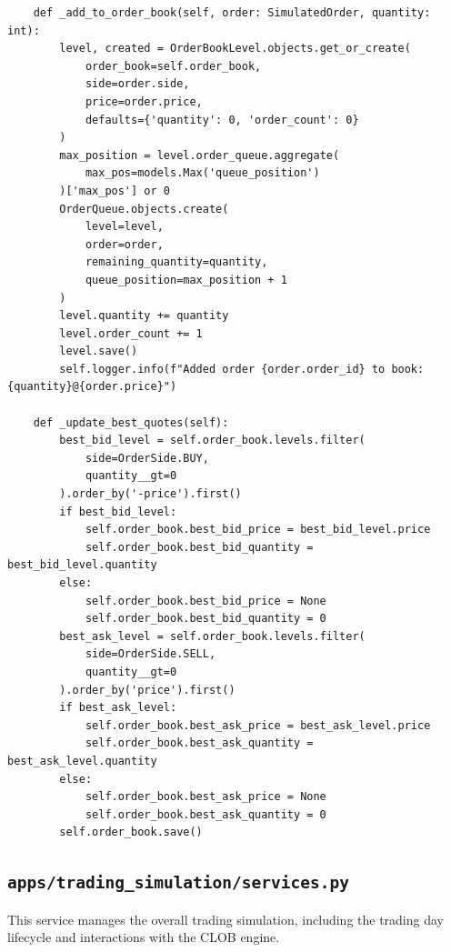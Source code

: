\documentclass[12pt]{article}
\begin{document}
\begin{verbatim}
    def _add_to_order_book(self, order: SimulatedOrder, quantity: int):
        level, created = OrderBookLevel.objects.get_or_create(
            order_book=self.order_book,
            side=order.side,
            price=order.price,
            defaults={'quantity': 0, 'order_count': 0}
        )
        max_position = level.order_queue.aggregate(
            max_pos=models.Max('queue_position')
        )['max_pos'] or 0
        OrderQueue.objects.create(
            level=level,
            order=order,
            remaining_quantity=quantity,
            queue_position=max_position + 1
        )
        level.quantity += quantity
        level.order_count += 1
        level.save()
        self.logger.info(f"Added order {order.order_id} to book: {quantity}@{order.price}")

    def _update_best_quotes(self):
        best_bid_level = self.order_book.levels.filter(
            side=OrderSide.BUY,
            quantity__gt=0
        ).order_by('-price').first()
        if best_bid_level:
            self.order_book.best_bid_price = best_bid_level.price
            self.order_book.best_bid_quantity = best_bid_level.quantity
        else:
            self.order_book.best_bid_price = None
            self.order_book.best_bid_quantity = 0
        best_ask_level = self.order_book.levels.filter(
            side=OrderSide.SELL,
            quantity__gt=0
        ).order_by('price').first()
        if best_ask_level:
            self.order_book.best_ask_price = best_ask_level.price
            self.order_book.best_ask_quantity = best_ask_level.quantity
        else:
            self.order_book.best_ask_price = None
            self.order_book.best_ask_quantity = 0
        self.order_book.save()
\end{verbatim}

\subsection{\texttt{apps/trading\_simulation/services.py}}

This service manages the overall trading simulation, including the trading day lifecycle and interactions with the CLOB engine.
\end{document}
